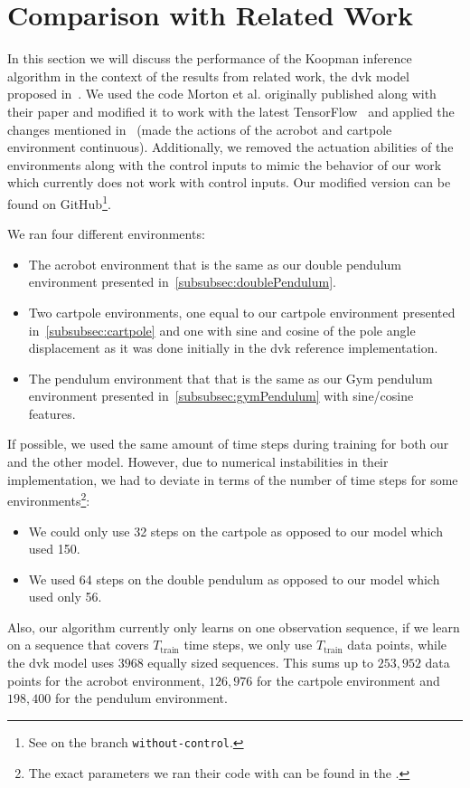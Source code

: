 \section{Comparison with Related Work}
	In this section we will discuss the performance of the Koopman inference algorithm in the context of the results from related work, the \ac{dvk} model proposed in~\cite{mortonDeepVariationalKoopman2019a}. We used the code Morton et al. originally published along with their paper and modified it to work with the latest TensorFlow~\cite{abadiTensorFlowLargeScaleMachine2016} and applied the changes mentioned in~\cite{mortonDeepVariationalKoopman2019a} (\ie made the actions of the acrobot and cartpole environment continuous). Additionally, we removed the actuation abilities of the environments along with the control inputs to mimic the behavior of our work which currently does not work with control inputs. Our modified version can be found on GitHub\footnote{See  on the branch \texttt{without-control}.}.

	We ran four different environments:
	\begin{itemize}
		\item The acrobot environment that is the same as our double pendulum environment presented in~\autoref{subsubsec:doublePendulum}.
		\item Two cartpole environments, one equal to our cartpole environment presented in~\autoref{subsubsec:cartpole} and one with sine and cosine of the pole angle displacement as it was done initially in the \ac{dvk} reference implementation.
		\item The pendulum environment that that is the same as our Gym pendulum environment presented in~\autoref{subsubsec:gymPendulum} with sine/cosine features.
	\end{itemize}
	If possible, we used the same amount of time steps during training for both our and the other model. However, due to numerical instabilities in their implementation, we had to deviate in terms of the number of time steps for some environments\footnote{The exact parameters we ran their code with can be found in the .}:
	\begin{itemize}
		\item We could only use 32 steps on the cartpole as opposed to our model which used 150.
		\item We used 64 steps on the double pendulum as opposed to our model which used only 56.
	\end{itemize}
	Also, our algorithm currently only learns on one observation sequence, \ie if we learn on a sequence that covers \(T_\text{train}\) time steps, we only use \(T_\text{train}\) data points, while the \ac{dvk} model uses \(3968\) equally sized sequences. This sums up to \(253,\!952\) data points for the acrobot environment, \(126,\!976\) for the cartpole environment and \(198,\!400\) for the pendulum environment.

